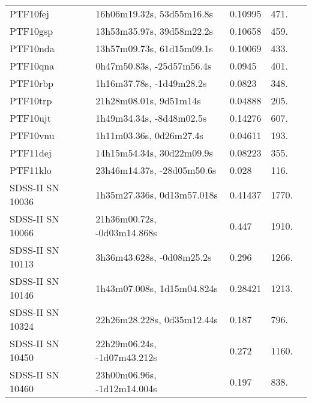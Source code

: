 \begin{longtable}{lllll}
         PTF10fej &      16h06m19.32s, 53d55m16.8s &  0.10995 &           471. &    \citet{2003SDSS1.C...0000:} \\
         PTF10gsp &      13h53m35.97s, 39d58m22.2s &  0.10658 &           459. &    \citet{2005SDSS4.C...0000:} \\
         PTF10nda &      13h57m09.73s, 61d15m09.1s &  0.10069 &           433. &    \citet{2004SDSS2.C...0000:} \\
         PTF10qna &      0h47m50.83s, -25d57m56.4s &   0.0945 &           401. &    \citet{20032dF...C...0000C} \\
         PTF10rbp &       1h16m37.78s, -1d49m28.2s &   0.0823 &           348. &    \citet{2014MNRAS.438.1391P} \\
         PTF10trp &         21h28m08.01s, 9d51m14s &  0.04888 &           205. &    \citet{2004SDSS2.C...0000:} \\
         PTF10ujt &       1h49m34.34s, -8d48m02.5s &  0.14276 &           607. &    \citet{2003SDSS1.C...0000:} \\
         PTF10vnu &        1h11m03.36s, 0d26m27.4s &  0.04611 &           193. &    \citet{2016SDSSD.C...0000:} \\
         PTF11dej &      14h15m54.34s, 30d22m09.9s &  0.08223 &           355. &    \citet{2011ApJ...735..125S} \\
         PTF11klo &     23h46m14.37s, -28d05m50.6s &    0.028 &           116. &    \citet{1999AJ....118.1468D} \\
 SDSS-II SN 10036 &     1h35m27.336s, 0d13m57.018s &  0.41437 &          1770. &    \citet{2016SDSSD.C...0000:} \\
 SDSS-II SN 10066 &    21h36m00.72s, -0d03m14.868s &    0.447 &          1910. &    \citet{2011ApJ...738..162S} \\
 SDSS-II SN 10113 &      3h36m43.628s, -0d08m25.2s &    0.296 &          1266. &    \citet{2010ApJ...713.1026D} \\
 SDSS-II SN 10146 &     1h43m07.008s, 1d15m04.824s &  0.28421 &          1213. &    \citet{2016SDSSD.C...0000:} \\
 SDSS-II SN 10324 &     22h26m28.228s, 0d35m12.44s &    0.187 &           796. &    \citet{2011ApJ...738..162S} \\
 SDSS-II SN 10450 &    22h29m06.24s, -1d07m43.212s &    0.272 &          1160. &    \citet{2011ApJ...738..162S} \\
 SDSS-II SN 10460 &    23h00m06.96s, -1d12m14.004s &    0.197 &           838. &    \citet{2011ApJ...738..162S} \\

\end{longtable}
